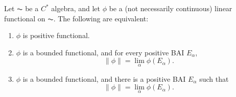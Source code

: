\begin{theorem}
    Let $\AC$ be a $C^*$ algebra, and let $\phi$ be a (not necessarily continuous) linear functional on $\AC$. The following are equivalent:
    \begin{enumerate}
        \item $\phi$ is positive functional.

        \item $\phi$ is a bounded functional, and for every positive BAI $E_\alpha$,
        \[ \| \phi \| = \lim_\alpha \phi(E_\alpha). \]

        \item $\phi$ is a bounded functional, and there is a positive BAI $E_\alpha$ such that
        \[ \| \phi \| = \lim_\alpha \phi(E_\alpha). \]
    \end{enumerate}
\end{theorem}
